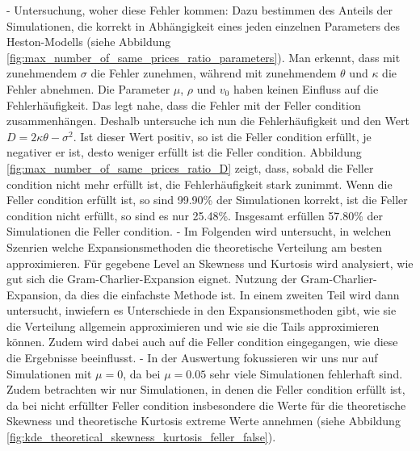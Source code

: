 - Untersuchung, woher diese Fehler kommen: Dazu bestimmen des Anteils der Simulationen, die korrekt in Abhängigkeit eines jeden einzelnen Parameters des Heston-Modells (siehe Abbildung \ref{fig:max_number_of_same_prices_ratio_parameters}). Man erkennt, dass mit zunehmendem $\sigma$ die Fehler zunehmen, während mit zunehmendem $\theta$ und $\kappa$ die Fehler abnehmen. Die Parameter $\mu$, $\rho$ und $v_0$ haben keinen Einfluss auf die Fehlerhäufigkeit. Das legt nahe, dass die Fehler mit der Feller condition zusammenhängen. Deshalb untersuche ich nun die Fehlerhäufigkeit und den Wert $D = 2\kappa\theta - \sigma^2$. Ist dieser Wert positiv, so ist die Feller condition erfüllt, je negativer er ist, desto weniger erfüllt ist die Feller condition. Abbildung \ref{fig:max_number_of_same_prices_ratio_D} zeigt, dass, sobald die Feller condition nicht mehr erfüllt ist, die Fehlerhäufigkeit stark zunimmt. Wenn die Feller condition erfüllt ist, so sind 99.90\% der Simulationen korrekt, ist die Feller condition nicht erfüllt, so sind es nur 25.48\%. Insgesamt erfüllen 57.80\% der Simulationen die Feller condition.
- Im Folgenden wird untersucht, in welchen Szenrien welche Expansionsmethoden die theoretische Verteilung am besten approximieren. Für gegebene Level an Skewness und Kurtosis wird analysiert, wie gut sich die Gram-Charlier-Expansion eignet. Nutzung der Gram-Charlier-Expansion, da dies die einfachste Methode ist. In einem zweiten Teil wird dann untersucht, inwiefern es Unterschiede in den Expansionsmethoden gibt, wie sie die Verteilung allgemein approximieren und wie sie die Tails approximieren können. Zudem wird dabei auch auf die Feller condition eingegangen, wie diese die Ergebnisse beeinflusst.
- In der Auswertung fokussieren wir uns nur auf Simulationen mit $\mu=0$, da bei $\mu=0.05$ sehr viele Simulationen fehlerhaft sind. Zudem betrachten wir nur Simulationen, in denen die Feller condition erfüllt ist, da bei nicht erfüllter Feller condition insbesondere die Werte für die theoretische Skewness und theoretische Kurtosis extreme Werte annehmen (siehe Abbildung \ref{fig:kde_theoretical_skewness_kurtosis_feller_false}).

